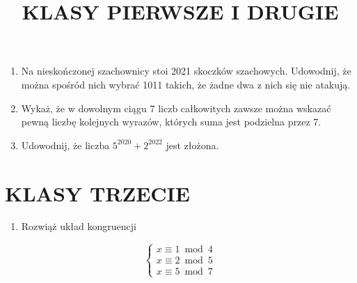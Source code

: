 \documentclass[10pt]{article}
\title{KLASY PIERWSZE I DRUGIE }
\author{}
\date{}
\begin{document}
\maketitle
\begin{enumerate}
  \item Na nieskończonej szachownicy stoi 2021 skoczków szachowych. Udowodnij, że można spośród nich wybrać 1011 takich, że żadne dwa z nich się nie atakują.
  \item Wykaż, że w dowolnym ciągu 7 liczb całkowitych zawsze można wskazać pewną liczbę kolejnych wyrazów, których suma jest podzielna przez 7.
  \item Udowodnij, że liczba \(5^{2020}+2^{2022}\) jest złożona.
\end{enumerate}

\section*{KLASY TRZECIE}
\begin{enumerate}
  \item Rozwiąż układ kongruencji
\end{enumerate}

\[
\left\{\begin{array}{l}
x \equiv 1 \bmod 4 \\
x \equiv 2 \bmod 5 \\
x \equiv 5 \bmod 7
\end{array}\right.
\]
\end{document}
